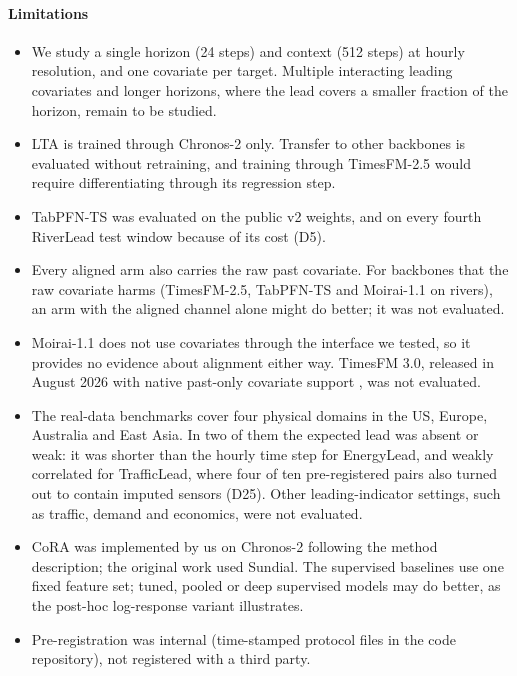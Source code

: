 \documentclass[preprint,11pt,authoryear]{elsarticle}
\newcommand{\lta}{\textsc{LTA}}
\begin{document}
\paragraph{Limitations}
\begin{itemize}
\item We study a single horizon (24 steps) and context (512 steps) at hourly resolution, and one covariate per target. Multiple interacting leading covariates and longer horizons, where the lead covers a smaller fraction of the horizon, remain to be studied.
\item \lta{} is trained through Chronos-2 only. Transfer to other backbones is evaluated without retraining, and training through TimesFM-2.5 would require differentiating through its regression step.
\item TabPFN-TS was evaluated on the public v2 weights, and on every fourth RiverLead test window because of its cost (D5).
\item Every aligned arm also carries the raw past covariate. For backbones that the raw covariate harms (TimesFM-2.5, TabPFN-TS and Moirai-1.1 on rivers), an arm with the aligned channel alone might do better; it was not evaluated.
\item Moirai-1.1 does not use covariates through the interface we tested, so it provides no evidence about alignment either way. TimesFM 3.0, released in August 2026 with native past-only covariate support \citep{timesfm_github}, was not evaluated.
\item The real-data benchmarks cover four physical domains in the US, Europe, Australia and East Asia. In two of them the expected lead was absent or weak: it was shorter than the hourly time step for EnergyLead, and weakly correlated for TrafficLead, where four of ten pre-registered pairs also turned out to contain imputed sensors (D25). Other leading-indicator settings, such as traffic, demand and economics, were not evaluated.
\item CoRA was implemented by us on Chronos-2 following the method description; the original work used Sundial. The supervised baselines use one fixed feature set; tuned, pooled or deep supervised models may do better, as the post-hoc log-response variant illustrates.
\item Pre-registration was internal (time-stamped protocol files in the code repository), not registered with a third party.
\end{itemize}

\end{document}
